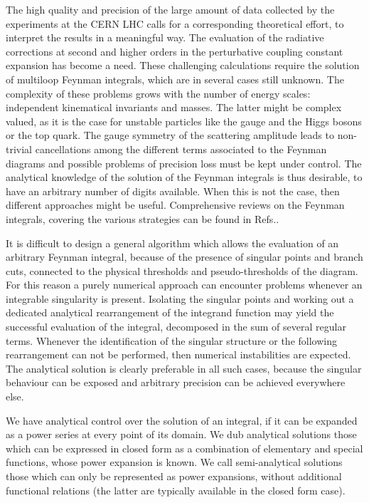 \documentclass[final,1p,times]{elsarticle}
\begin{document}
The high quality and precision of the large amount of data collected by the experiments at the CERN LHC calls for a corresponding theoretical effort, to interpret the results in a meaningful way.
The evaluation of the radiative corrections at second and higher orders in the perturbative coupling constant expansion has become a need.
These challenging calculations require the solution of multiloop Feynman integrals, which are in several cases still unknown.
The complexity of these problems grows with the number of energy scales: independent kinematical invariants and masses. The latter might be complex valued, as it is the case for unstable particles like the gauge and the Higgs bosons or the top quark.
The gauge symmetry of the scattering amplitude leads to non-trivial cancellations among the different terms associated to the Feynman diagrams and possible problems of precision loss must be kept under control. The analytical knowledge of the solution of the Feynman integrals is thus desirable, to have an arbitrary number of digits available. When this is not the case, then different approaches might be useful.
Comprehensive reviews on the Feynman integrals, covering the various strategies can be found in Refs.\cite{Heinrich:2020ybq,Weinzierl:2022eaz,Bourjaily:2022bwx,Abreu:2022mfk,Blumlein:2022zkr}.



It is difficult to design  a general algorithm which allows the evaluation of an arbitrary Feynman integral, because of the presence of singular points and branch cuts, connected to the physical thresholds and pseudo-thresholds of the diagram. For this reason a purely numerical approach \cite{Smirnov:2015mct,Borowka:2017idc} can encounter problems whenever an integrable singularity is present. Isolating the singular points and working out a dedicated analytical rearrangement of the integrand function may yield the successful evaluation of the integral, decomposed in the sum of several regular terms.
Whenever the identification of the singular structure or the following rearrangement can not be performed, then numerical instabilities are expected. The analytical solution is clearly preferable in all such cases, because the singular behaviour can be exposed and arbitrary precision can be achieved everywhere else.

We have analytical control over the solution of an integral, if it can be expanded as a power series at every point of its domain.
We dub analytical solutions those which can be expressed in closed form as a combination of elementary and special functions, whose power expansion is known. We call semi-analytical solutions those which can only be represented as power expansions, without additional functional relations (the latter are typically available in the closed form case).
\end{document}
